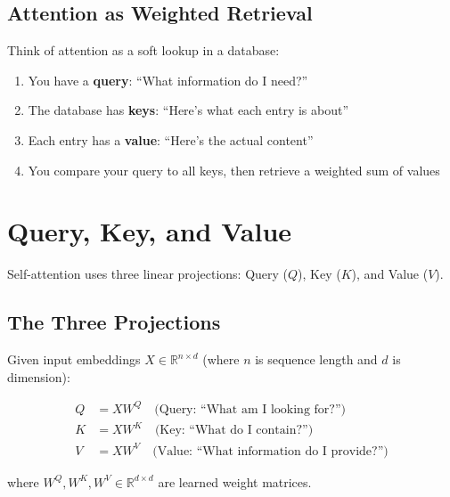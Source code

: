 \subsection{Attention as Weighted Retrieval}

Think of attention as a soft lookup in a database:
\begin{enumerate}
    \item You have a \textbf{query}: ``What information do I need?''
    \item The database has \textbf{keys}: ``Here's what each entry is about''
    \item Each entry has a \textbf{value}: ``Here's the actual content''
    \item You compare your query to all keys, then retrieve a weighted sum of values
\end{enumerate}

\section{Query, Key, and Value}

Self-attention uses three linear projections: Query ($Q$), Key ($K$), and Value ($V$).

\subsection{The Three Projections}

Given input embeddings $X \in \mathbb{R}^{n \times d}$ (where $n$ is sequence length and $d$ is dimension):

\begin{align}
Q &= X W^Q \quad \text{(Query: ``What am I looking for?'')} \\
K &= X W^K \quad \text{(Key: ``What do I contain?'')} \\
V &= X W^V \quad \text{(Value: ``What information do I provide?'')}
\end{align}

where $W^Q, W^K, W^V \in \mathbb{R}^{d \times d}$ are learned weight matrices.

